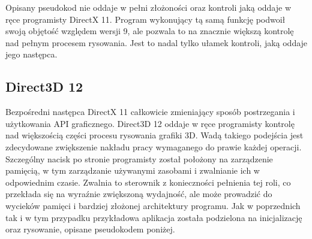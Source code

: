 Opisany pseudokod nie oddaje w pełni złożoności oraz kontroli jaką
oddaje w ręce programisty DirectX 11. Program wykonujący tą samą funkcję
podwoił swoją objętość względem wersji 9, ale pozwala to na znacznie
większą kontrolę nad pełnym procesem rysowania. Jest to nadal tylko
ułamek kontroli, jaką oddaje jego następca.

\subsection{Direct3D 12}

Bezpośredni następca DirectX 11 całkowicie zmieniający sposób
postrzegania i użytkowania API graficznego. Direct3D 12 oddaje w ręce
programisty kontrolę nad większością części procesu rysowania grafiki
3D. Wadą takiego podejścia jest zdecydowane zwiększenie nakładu pracy
wymaganego do prawie każdej operacji. Szczególny nacisk po stronie
programisty został położony na zarządzenie pamięcią, w tym zarządzanie
używanymi zasobami i zwalnianie ich w odpowiednim czasie. Zwalnia to
sterownik z konieczności pełnienia tej roli, co przekłada się na
wyraźnie zwiększoną wydajność, ale może prowadzić do wycieków pamięci i
bardziej złożonej architektury programu. Jak w poprzednich tak i w tym przypadku przykładowa aplikacja została
podzielona na inicjalizację oraz rysowanie, opisane pseudokodem poniżej.


